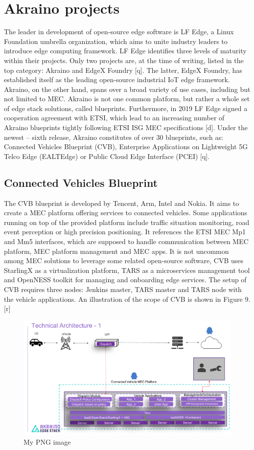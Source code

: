 \documentclass[12pt,a4paper,twoside]{report}
\begin{document}
\section{Akraino projects}
The leader in development of open-source edge software is LF Edge, a Linux Foundation umbrella organization, which aims to unite industry leaders to introduce edge computing framework. LF Edge identifies three levels of maturity within their projects. Only two projects are, at the time of writing, listed in the top category: Akraino and EdgeX Foundry [q]. The latter, EdgeX Foundry, has established itself as the leading open-source industrial IoT edge framework. Akraino, on the other hand, spans over a broad variety of use cases, including but not limited to MEC. Akraino is not one common platform, but rather a whole set of edge stack solutions, called blueprints. Furthermore, in 2019 LF Edge signed a cooperation agreement with ETSI, which lead to an increasing number of Akraino blueprints tightly following ETSI ISG MEC specifications [d]. Under the newest – sixth release, Akraino constitutes of over 30 blueprints, such as: Connected Vehicles Blueprint (CVB), Enterprise Applications on Lightweight 5G Telco Edge (EALTEdge) or Public Cloud Edge Interface (PCEI) [q].
\subsection{Connected Vehicles Blueprint}
The CVB blueprint is developed by Tencent, Arm, Intel and Nokia. It aims to create a MEC platform offering services to connected vehicles. Some applications running on top of the provided platform include traffic situation monitoring, road event perception or high precision positioning. It references the ETSI MEC Mp1 and Mm5 interfaces, which are supposed to handle communication between MEC platform, MEC platform management and MEC apps. It is not uncommon among MEC solutions to leverage some related open-source software, CVB uses StarlingX as a virtualization platform, TARS as a microservices management tool and OpenNESS toolkit for managing and onboarding edge services. The setup of CVB requires three nodes: Jenkins master, TARS master and TARS node with the vehicle applications. An illustration of the scope of CVB is shown in Figure 9. [r]
\begin{figure}[ht]
	\centering
	\includegraphics[width=\textwidth]{./images/akraino-cvb.png}
	\caption{My PNG image}
\end{figure}
\end{document}
